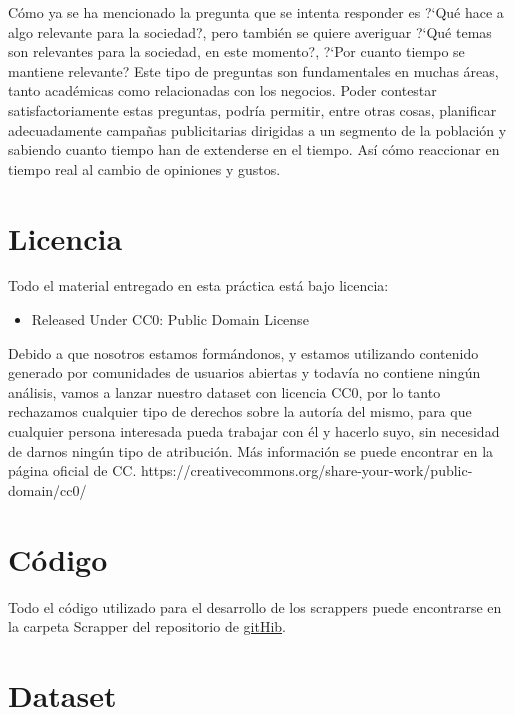 \documentclass[a4paper,12pt]{article}
\begin{document}
C\'omo ya se ha mencionado la pregunta que se intenta responder es ?`Qu\'e hace a algo relevante para la sociedad?, pero tambi\'en se quiere averiguar ?`Qu\'e temas son relevantes para la sociedad, en este momento?, ?`Por cuanto tiempo se mantiene  relevante? Este tipo de preguntas son fundamentales en muchas \'areas, tanto acad\'emicas como relacionadas con los negocios. Poder contestar satisfactoriamente estas preguntas, podr\'ia permitir, entre otras cosas, planificar adecuadamente campa\~nas publicitarias dirigidas a un segmento de la poblaci\'on y sabiendo cuanto tiempo han de extenderse en el tiempo. As\'i c\'omo reaccionar en tiempo real al cambio de opiniones y gustos.

\section{Licencia}

Todo el material entregado en esta pr\'actica est\'a bajo licencia:

\begin{itemize}

\item Released Under CC0: Public Domain License


\end{itemize}

Debido a que nosotros estamos form\'andonos, y estamos utilizando contenido generado por comunidades de usuarios abiertas y todav\'ia no contiene ning\'un an\'alisis, vamos a lanzar nuestro dataset con licencia CC0, por lo tanto rechazamos cualquier tipo de derechos sobre la autor\'ia del mismo, para que cualquier persona interesada pueda trabajar con \'el y hacerlo suyo, sin necesidad de darnos ning\'un tipo de atribuci\'on.  M\'as informaci\'on se puede encontrar en la p\'agina oficial de CC.
https://creativecommons.org/share-your-work/public-domain/cc0/

\section{C\'odigo}

Todo el c\'odigo utilizado para el desarrollo de los scrappers puede encontrarse en la carpeta Scrapper del repositorio de \href{https://github.com/Envivi-git/News_analysis.git}{gitHib}.

\section{Dataset}
\end{document}
